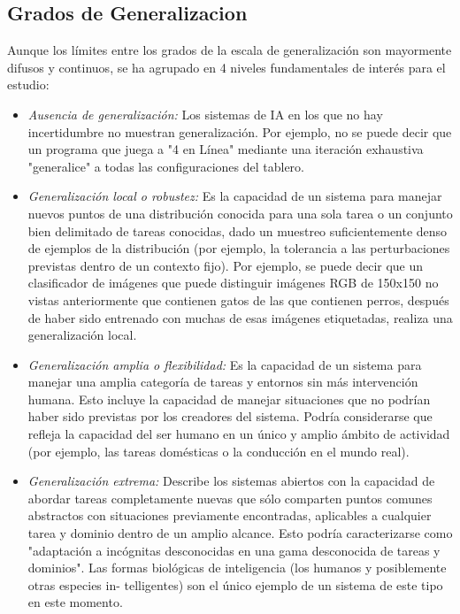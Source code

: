 \subsection{Grados de Generalizacion}

Aunque los límites entre los grados de la escala de generalización son mayormente difusos y continuos, se ha agrupado en 4 niveles fundamentales de interés para el estudio:

\begin{itemize}
\item \textit{Ausencia de generalización:} Los sistemas de IA en los que no hay incertidumbre no muestran generalización. Por ejemplo, no se puede decir que un programa que juega a "4 en Línea" mediante una iteración exhaustiva "generalice" a todas las configuraciones del tablero.

\item \textit{Generalización local o robustez:} Es la capacidad de un sistema para manejar nuevos puntos de una distribución conocida para una sola tarea o un conjunto bien delimitado de tareas conocidas, dado un muestreo suficientemente denso de ejemplos de la distribución (por ejemplo, la tolerancia a las perturbaciones previstas dentro de un contexto fijo). Por ejemplo, se puede decir que un clasificador de imágenes que puede distinguir imágenes RGB de 150x150 no vistas anteriormente que contienen gatos de las que contienen perros, después de haber sido entrenado con muchas de esas imágenes etiquetadas, realiza una generalización local. 

\item \textit{Generalización amplia o flexibilidad:} Es la capacidad de un sistema para manejar una amplia categoría de tareas y entornos sin más intervención humana. Esto incluye la capacidad de manejar situaciones que no podrían haber sido previstas por los creadores del sistema. Podría considerarse que refleja la capacidad del ser humano en un único y amplio ámbito de actividad (por ejemplo, las tareas domésticas o la conducción en el mundo real).

\item \textit{Generalización extrema:} Describe los sistemas abiertos con la capacidad de abordar tareas completamente nuevas que sólo comparten puntos comunes abstractos con situaciones previamente encontradas, aplicables a cualquier tarea y dominio dentro de un amplio alcance. Esto podría caracterizarse como "adaptación a incógnitas desconocidas en una gama desconocida de tareas y dominios". Las formas biológicas de inteligencia (los humanos y posiblemente otras especies in- telligentes) son el único ejemplo de un sistema de este tipo en este momento.
\end{itemize}

